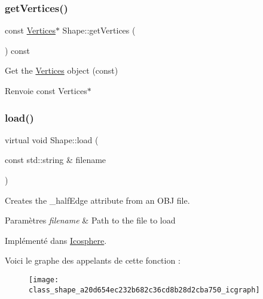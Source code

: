 \subsubsection{\texorpdfstring{get\+Vertices()}{getVertices()}\hspace{0.1cm}{\footnotesize\ttfamily [2/2]}}
{\footnotesize\ttfamily const \hyperlink{struct_shape_1_1_vertices}{Vertices}$\ast$ Shape\+::get\+Vertices (\begin{DoxyParamCaption}{ }\end{DoxyParamCaption}) const\hspace{0.3cm}{\ttfamily [inline]}}



Get the \hyperlink{struct_shape_1_1_vertices}{Vertices} object (const) 

\begin{DoxyReturn}{Renvoie}
const Vertices$\ast$ 
\end{DoxyReturn}
\mbox{\label{class_shape_a20d654ec232b682c36cd8b28d2cba750}} 
\subsubsection{\texorpdfstring{load()}{load()}}
{\footnotesize\ttfamily virtual void Shape\+::load (\begin{DoxyParamCaption}\item[{const std\+::string \&}]{filename }\end{DoxyParamCaption})\hspace{0.3cm}{\ttfamily [pure virtual]}}



Creates the \+\_\+half\+Edge attribute from an O\+BJ file. 


\begin{DoxyParams}{Paramètres}
{\em filename} & Path to the file to load \\
\hline
\end{DoxyParams}


Implémenté dans \hyperlink{class_icosphere_a1b20bf118a66f5202228a5a4522bd7fd}{Icosphere}.

Voici le graphe des appelants de cette fonction \+:\nopagebreak
\begin{figure}[H]
\begin{center}
\leavevmode
\texttt{[image: class\_shape\_a20d654ec232b682c36cd8b28d2cba750\_icgraph]}
\end{center}
\end{figure}
\mbox{\label{class_shape_a04294d1d80623bb8c5a7d4037549fa27}} 

